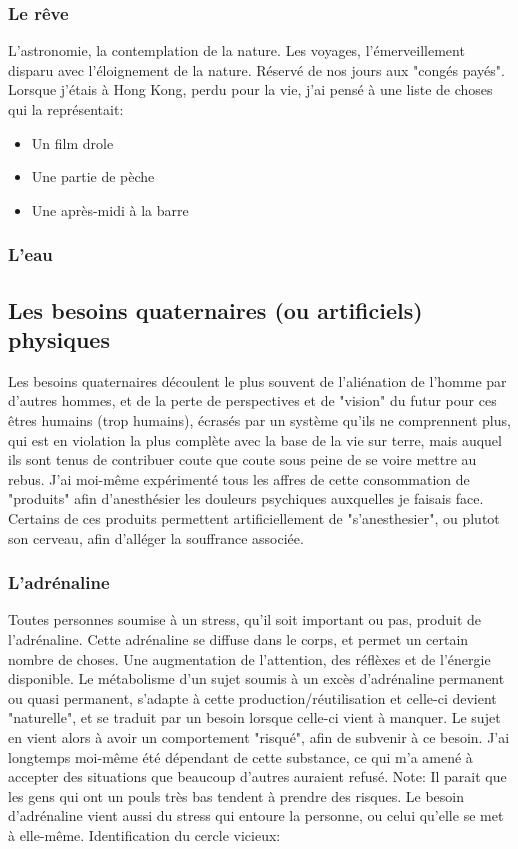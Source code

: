 \documentclass[11pt]{article} %
\begin{document}
\subsubsection{Le rêve}
L'astronomie, la contemplation de la nature. Les voyages, l'émerveillement disparu avec l'éloignement de la nature. Réservé de nos jours aux "congés payés".
Lorsque j'étais à Hong Kong, perdu pour la vie, j'ai pensé à une liste de choses qui la représentait:
\begin{itemize}
\item
Un film drole
\item
Une partie de pèche
\item
Une après-midi à la barre

\end{itemize}
\subsubsection{L'eau}

\subsection{Les besoins quaternaires (ou artificiels) physiques}
Les besoins quaternaires découlent le plus souvent de l'aliénation de l'homme par d'autres hommes, et de la perte de perspectives et de "vision" du futur pour ces êtres humains (trop humains), écrasés par un système qu'ils ne comprennent plus, qui est en violation la plus complète avec la base de la vie sur terre, mais auquel ils sont tenus de contribuer coute que coute sous peine de se voire mettre au rebus.
J'ai moi-même expérimenté tous les affres de cette consommation de "produits" afin d'anesthésier les douleurs psychiques auxquelles je faisais face.
Certains de ces produits permettent artificiellement de "s'anesthesier", ou plutot son cerveau, afin d'alléger la souffrance associée.
\subsubsection{L'adrénaline}
Toutes personnes soumise à un stress, qu'il soit important ou pas, produit de l'adrénaline. Cette adrénaline se diffuse dans le corps, et permet un certain nombre de choses. Une augmentation de l'attention, des réflèxes et de l'énergie disponible.
Le métabolisme d'un sujet soumis à un excès d'adrénaline permanent ou quasi permanent, s'adapte à cette production/réutilisation et celle-ci devient "naturelle", et se traduit par un besoin lorsque celle-ci vient à manquer.
Le sujet en vient alors à avoir un comportement "risqué", afin de subvenir à ce besoin. J'ai longtemps moi-même été dépendant de cette substance, ce qui m'a amené à accepter des situations que beaucoup d'autres auraient refusé.
Note: Il parait que les gens qui ont un pouls très bas tendent à prendre des risques.
Le besoin d'adrénaline vient aussi du stress qui entoure la personne, ou celui qu'elle se met à elle-même.
Identification du cercle vicieux:
\end{document}
